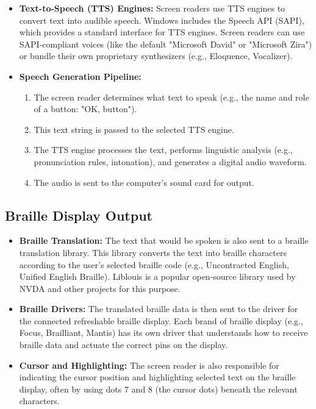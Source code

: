 \begin{itemize}
	\item \textbf{Text-to-Speech (TTS) Engines:} Screen readers use TTS engines to convert text into audible speech. Windows includes the Speech API (SAPI), which provides a standard interface for TTS engines. Screen readers can use SAPI-compliant voices (like the default "Microsoft David" or "Microsoft Zira") or bundle their own proprietary synthesizers (e.g., Eloquence, Vocalizer).
	\item \textbf{Speech Generation Pipeline:}
	      \begin{enumerate}
		      \item The screen reader determines what text to speak (e.g., the name and role of a button: "OK, button").
		      \item This text string is passed to the selected TTS engine.
		      \item The TTS engine processes the text, performs linguistic analysis (e.g., pronunciation rules, intonation), and generates a digital audio waveform.
		      \item The \gls{audio} is sent to the computer's sound card for output.
	      \end{enumerate}
\end{itemize}

\subsection{Braille Display Output}
\label{sub:braille-display-output}

\begin{itemize}
	\item \textbf{Braille Translation:} The text that would be spoken is also sent to a braille translation library. This library converts the text into braille characters according to the user's selected braille code (e.g., Uncontracted English, Unified English Braille). Liblouis is a popular open-source library used by NVDA and other projects for this purpose.
	\item \textbf{Braille Drivers:} The translated braille data is then sent to the driver for the connected refreshable braille display. Each brand of braille display (e.g., Focus, Brailliant, Mantis) has its own driver that understands how to receive braille data and actuate the correct pins on the display.
	\item \textbf{Cursor and Highlighting:} The screen reader is also responsible for indicating the cursor position and highlighting selected text on the braille display, often by using dots 7 and 8 (the cursor dots) beneath the relevant characters.
\end{itemize}

